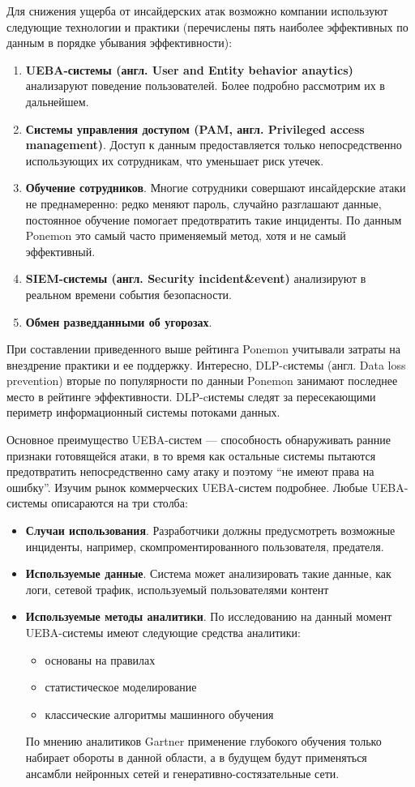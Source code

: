 Для снижения ущерба от инсайдерских атак возможно компании используют следующие технологии и практики (перечислены пять наиболее эффективных по данным\cite{ponemon} в порядке убывания эффективности):
\begin{enumerate}
\item \textbf{UEBA-системы (англ. User and Entity behavior anaytics)} анализаруют поведение пользователей. Более подробно рассмотрим их в дальнейшем.
\item \textbf{Системы управления доступом (PAM,  англ. Privileged access management)}. Доступ к данным предоставляется только непосредственно использующих их сотрудникам, что уменьшает риск утечек.
\item \textbf{Обучение сотрудников}. Многие сотрудники совершают инсайдерские атаки не преднамеренно: редко меняют пароль, случайно разглашают данные, постоянное обучение помогает предотвратить такие инциденты. По данным Ponemon это самый часто применяемый метод, хотя и не самый эффективный. 
\item \textbf{SIEM-системы (англ. Security incident\&event)} анализируют в реальном времени события безопасности.
\item \textbf{Обмен разведданными об угорозах}.
\end{enumerate}

При составлении приведенного выше рейтинга Ponemon учитывали затраты на внездрение практики и ее поддержку.
Интересно, {DLP-cистемы (англ. Data loss prevention)} вторые по популярности по данныи Ponemon занимают последнее место в рейтинге эффективности. DLP-cистемы следят за пересекающими периметр информационный системы потоками данных.

Основное преимущество UEBA-систем --- способность обнаруживать ранние признаки готовящейся атаки, в то время как остальные системы пытаются предотвратить непосредственно саму атаку и поэтому ``не имеют права на ошибку''. Изучим рынок коммерческих UEBA-систем подробнее. Любые UEBA-системы описараются на три столба\cite{gartner}:
\begin{itemize}
\item \textbf{Случаи использования}. Разработчики должны предусмотреть возможные инциденты, например, скомпроментированного пользователя, предателя.
\item \textbf{Используемые данные}. Система может анализировать такие данные, как логи, сетевой трафик, используемый пользователями контент
\item \textbf{Используемые методы аналитики}. По исследованию\cite{gartner} на данный момент UEBA-системы имеют следующие средства аналитики:
\begin{itemize}
\item основаны на правилах
\item статистическое моделирование
\item классические алгоритмы машинного обучения
\end{itemize}
По мнению аналитиков Gartner применение глубокого обучения только набирает обороты в данной области, а в будущем будут применяться ансамбли нейронных сетей и генеративно-состязательные сети.
\end{itemize}


